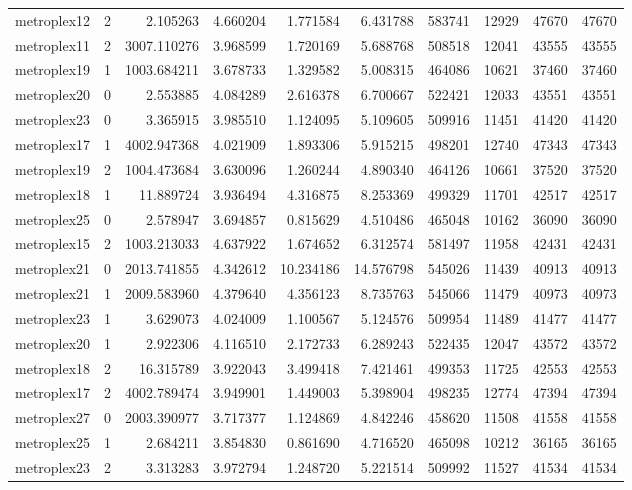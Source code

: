 \begin{longtable}{|l|r|r|r|r|r|r|r|r|r|}
metroplex12 & 2 & 2.105263 & 4.660204 & 1.771584 & 6.431788 & 583741 & 12929 & 47670 & 47670 \\
metroplex11 & 2 & 3007.110276 & 3.968599 & 1.720169 & 5.688768 & 508518 & 12041 & 43555 & 43555 \\
metroplex19 & 1 & 1003.684211 & 3.678733 & 1.329582 & 5.008315 & 464086 & 10621 & 37460 & 37460 \\
metroplex20 & 0 & 2.553885 & 4.084289 & 2.616378 & 6.700667 & 522421 & 12033 & 43551 & 43551 \\
metroplex23 & 0 & 3.365915 & 3.985510 & 1.124095 & 5.109605 & 509916 & 11451 & 41420 & 41420 \\
metroplex17 & 1 & 4002.947368 & 4.021909 & 1.893306 & 5.915215 & 498201 & 12740 & 47343 & 47343 \\
metroplex19 & 2 & 1004.473684 & 3.630096 & 1.260244 & 4.890340 & 464126 & 10661 & 37520 & 37520 \\
metroplex18 & 1 & 11.889724 & 3.936494 & 4.316875 & 8.253369 & 499329 & 11701 & 42517 & 42517 \\
metroplex25 & 0 & 2.578947 & 3.694857 & 0.815629 & 4.510486 & 465048 & 10162 & 36090 & 36090 \\
metroplex15 & 2 & 1003.213033 & 4.637922 & 1.674652 & 6.312574 & 581497 & 11958 & 42431 & 42431 \\
metroplex21 & 0 & 2013.741855 & 4.342612 & 10.234186 & 14.576798 & 545026 & 11439 & 40913 & 40913 \\
metroplex21 & 1 & 2009.583960 & 4.379640 & 4.356123 & 8.735763 & 545066 & 11479 & 40973 & 40973 \\
metroplex23 & 1 & 3.629073 & 4.024009 & 1.100567 & 5.124576 & 509954 & 11489 & 41477 & 41477 \\
metroplex20 & 1 & 2.922306 & 4.116510 & 2.172733 & 6.289243 & 522435 & 12047 & 43572 & 43572 \\
metroplex18 & 2 & 16.315789 & 3.922043 & 3.499418 & 7.421461 & 499353 & 11725 & 42553 & 42553 \\
metroplex17 & 2 & 4002.789474 & 3.949901 & 1.449003 & 5.398904 & 498235 & 12774 & 47394 & 47394 \\
metroplex27 & 0 & 2003.390977 & 3.717377 & 1.124869 & 4.842246 & 458620 & 11508 & 41558 & 41558 \\
metroplex25 & 1 & 2.684211 & 3.854830 & 0.861690 & 4.716520 & 465098 & 10212 & 36165 & 36165 \\
metroplex23 & 2 & 3.313283 & 3.972794 & 1.248720 & 5.221514 & 509992 & 11527 & 41534 & 41534 \\

\end{longtable}

